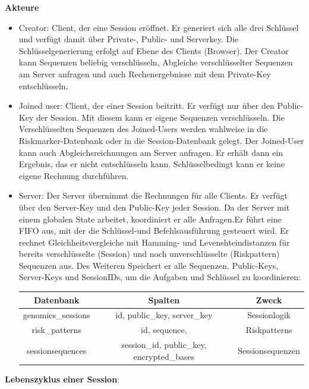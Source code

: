 \textbf{Akteure}
\begin{itemize}
    \item Creator: Client, der eine Session eröffnet. Er generiert sich alle drei Schlüssel und verfügt damit über Private-, Public- und Serverkey. Die Schlüsselgenerierung erfolgt auf Ebene des Clients (Browser).  
    Der Creator kann Sequenzen beliebig verschlüsseln, Abgleiche verschlüsselter Sequenzen am Server anfragen und auch Rechenergebnisse mit dem Private-Key entschlüsseln. 
    \item Joined user: Client, der einer Session beitritt. Er verfügt nur über den Public-Key der Session. Mit diesem kann er eigene Sequenzen verschlüsseln. Die Verschlüsselten Sequenzen des Joined-Users werden wahlweise in die Riskmarker-Datenbank oder in die Session-Datenbank gelegt. Der Joined-User kann auch Abgleichsreichnungen am Server anfragen. Er erhält dann ein Ergebnis, das er nicht entschlüsseln kann. Schlüsselbedingt kann er keine eigene Rechnung durchführen.
    \item Server: Der Server übernimmt die Rechnungen für alle Clients. Er verfügt über den Server-Key und den Public-Key jeder Session. Da der Server mit einem globalen State arbeitet, koordiniert er alle Anfragen.Er führt eine FIFO aus, mit der die Schlüssel-und Befehlsausführung gesteuert wird. Er rechnet Gleichheitsvergleiche mit Hamming- und Levenshteindistanzen für bereits verschlüsselte (Session) und noch unverschlüsselte (Riskpattern) Sequenzen aus. Des Weiteren Speichert er alle Sequenzen, Public-Keys, Server-Keys und SessionIDs, um die Aufgaben und Schlüssel zu koordinieren:

    \begin{table}[h]
    \centering
    \begin{tabular}{|c|c|c|}
    \hline
    \textbf{Datenbank} & \textbf{Spalten} & \textbf{Zweck} \\
    \hline
    \hline
    genomics\_sessions & id, public\_key, server\_key & Sessionlogik \\
    \hline
    risk\_patterns & id, sequence, & Riskpatterns\\
    \hline
    sessionsequences & session\_id, public\_key, encrypted\_bases & Sessionsequenzen\\
    \hline
    \end{tabular}
    \end{table}
\end{itemize}

\textbf{Lebenszyklus einer Session}:

